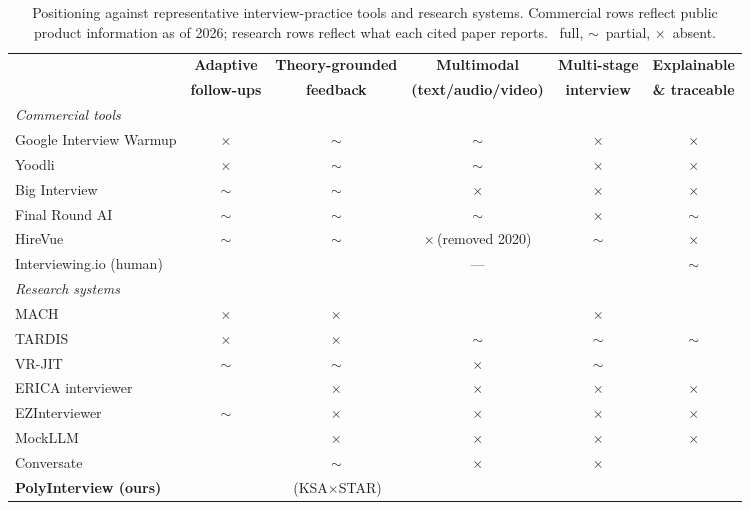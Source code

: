 \documentclass[11pt]{article}
\newcommand{\yes}{\textcolor{green!55!black}{\checkmark}}
\newcommand{\pmark}{\textcolor{orange!85!black}{$\sim$}}
\newcommand{\no}{\textcolor{red!70!black}{$\times$}}
\begin{document}
\begin{table}[t]
\centering\small
\setlength{\tabcolsep}{4pt}
\begin{tabular}{lccccc}
\toprule
& \textbf{Adaptive} & \textbf{Theory-grounded} & \textbf{Multimodal} & \textbf{Multi-stage} & \textbf{Explainable} \\
& \textbf{follow-ups} & \textbf{feedback} & \textbf{(text/audio/video)} & \textbf{interview} & \textbf{\& traceable} \\
\midrule
\multicolumn{6}{l}{\emph{Commercial tools}} \\
Google Interview Warmup & \no & \pmark & \pmark & \no & \no \\
Yoodli & \no & \pmark & \pmark & \no & \no \\
Big Interview & \pmark & \pmark & \no & \no & \no \\
Final Round AI & \pmark & \pmark & \pmark & \no & \pmark \\
HireVue & \pmark & \pmark & \no\,(removed 2020) & \pmark & \no \\
Interviewing.io (human) & \yes & \yes & --- & \yes & \pmark \\
\midrule
\multicolumn{6}{l}{\emph{Research systems}} \\
MACH \citep{hoque2013mach} & \no & \no & \yes & \no & \yes \\
TARDIS \citep{anderson2013tardis} & \no & \no & \pmark & \pmark & \pmark \\
VR-JIT \citep{smith2014virtual} & \pmark & \pmark & \no & \pmark & \yes \\
ERICA interviewer \citep{inoue2020jobinterviewer} & \yes & \no & \no & \no & \no \\
EZInterviewer \citep{li2023ezinterviewer} & \pmark & \no & \no & \no & \no \\
MockLLM \citep{sun2025mockllm} & \yes & \no & \no & \no & \no \\
Conversate \citep{daryanto2025conversate} & \yes & \pmark & \no & \no & \yes \\
\midrule
\textbf{PolyInterview (ours)} & \yes & \yes\,(KSA$\times$STAR) & \yes & \yes & \yes \\
\bottomrule
\end{tabular}
\caption{Positioning against representative interview-practice tools and research systems. Commercial rows reflect public product information as of 2026; research rows reflect what each cited paper reports. \yes\ full, \pmark\ partial, \no\ absent.}
\label{tab:compare}
\end{table}
\end{document}

